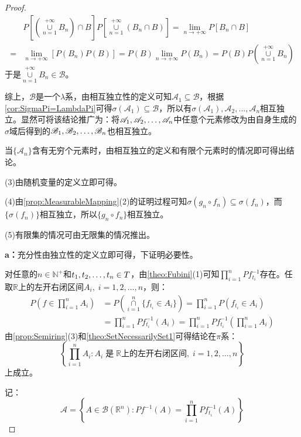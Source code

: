 \begin{proof}
\begin{align*}
		&P\left[\left(\underset{n=1}{\overset{+\infty}{\cup}}B_n\right)\cap B\right]P\left[\underset{n=1}{\overset{+\infty}{\cup}}(B_n\cap B)\right]=\lim_{n\to+\infty}P\left[B_n\cap B\right] \\
		=&\lim_{n\to+\infty}[P(B_n)P(B)]=P(B)\lim_{n\to+\infty}P(B_n) =P(B)P\left(\underset{n=1}{\overset{+\infty}{\cup}}B_n\right)
	\end{align*}
	于是$\underset{n=1}{\overset{+\infty}{\cup}}B_n\in\mathscr{B}$。\par
	综上，$\mathscr{B}$是一个$\lambda$系，由相互独立性的定义可知$\mathscr{A}_1\subseteq\mathscr{B}$，根据\cref{cor:SigmaPi=LambdaPi}可得$\sigma(\mathscr{A}_1)\subseteq\mathscr{B}$，所以有$\sigma(\mathscr{A}_1),\mathscr{A}_2,\dots,\mathscr{A}_n$相互独立。显然可将该结论推广为：将$\mathscr{A}_1, \mathscr{A}_2, \dots, \mathscr{A}_{n}$中任意个元素修改为由自身生成的$\sigma$域后得到的$\mathscr{B}_1, \mathscr{B}_2, \dots, \mathscr{B}_{n}$也相互独立。\par
	当$\{\mathscr{A}_n\}$含有无穷个元素时，由相互独立的定义和有限个元素时的情况即可得出结论。\par
	(3)由随机变量的定义立即可得。\par
	(4)由\cref{prop:MeasurableMapping}(2)的证明过程可知$\sigma(g_n\circ f_n)\subseteq\sigma(f_n)$，而$\{\sigma(f_n)\}$相互独立，所以$\{g_n\circ f_n\}$相互独立。\par
	(5)有限集的情况可由无限集的情况推出。\par
	\textbf{a：}充分性由独立性的定义立即可得，下证明必要性。\par
	对任意的$n\in\mathbb{N}^+$和$t_1, t_2, \dots, t_{n}\in T$，由\cref{theo:Fubini}(1)可知$\prod\limits_{i=1}^{n}Pf_{t_i}^{-1}$存在。任取$\mathbb{R}$上的左开右闭区间$A_i,\;i=1,2,\dots,n$，则：
	\begin{align*}
		P\left(f\in\prod_{i=1}^{n}A_i\right)&=P\left(\underset{i=1}{\overset{n}{\cap}}\{f_{t_i}\in A_i\}\right)=\prod_{i=1}^{n}P(f_{t_i}\in A_i) \\
		&=\prod_{i=1}^{n}Pf_{t_i}^{-1}(A_i)=\prod_{i=1}^{n}Pf_{t_i}^{-1}\left(\prod_{i=1}^{n}A_i\right)
	\end{align*}
	由\cref{prop:Semiring}(3)和\cref{theo:SetNecessarilySet1}可得结论在$\pi$系：
	\begin{equation*}
		\left\{\prod_{i=1}^{n}A_i:A_i\;\text{是}\;\mathbb{R}\text{上的左开右闭区间},\;i=1,2,\dots,n\right\}
	\end{equation*}
	上成立。\par
	记：
	\begin{equation*}
		\mathscr{A}=\left\{A\in\mathcal{B}(\mathbb{R}^{n}):Pf^{-1}(A)=\prod_{i=1}^{n}Pf_{t_i}^{-1}(A)\right\}

\end{equation*}
\end{proof}
